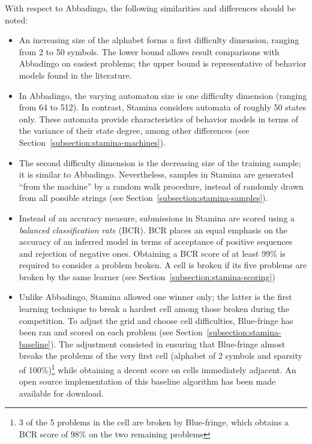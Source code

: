 With respect to Abbadingo, the following similarities and differences should be noted:

\begin{itemize}

\item An increasing size of the alphabet forms a first difficulty dimension, ranging from 2 to 50 symbols. The lower bound allows result comparisons with Abbadingo on easiest problems; the upper bound is representative of behavior models found in the literature.

\item In Abbadingo, the varying automaton size is one difficulty dimension (ranging from 64 to 512). In contrast, Stamina considers automata of roughly 50 states only. These automata provide characteristics of behavior models in terms of the variance of their state degree, among other differences (see Section~\ref{subsection:stamina-machines}).

\item The second difficulty dimension is the decreasing size of the training sample; it is similar to Abbadingo. Nevertheless, samples in Stamina are generated ``from the machine'' by a random walk procedure, instead of randomly drawn from all possible strings (see Section~\ref{subsection:stamina-samples}).

\item Instead of an accuracy measure, submissions in Stamina are scored using a \emph{balanced classification rate} (BCR). BCR places an equal emphasis on the accuracy of an inferred model in terms of acceptance of positive sequences and rejection of negative ones. Obtaining a BCR score of at least 99\% is required to consider a problem broken. A cell is broken if its five problems are broken by the same learner (see Section~\ref{subsection:stamina-scoring})

\item Unlike Abbadingo, Stamina allowed one winner only; the latter is the first learning technique to break a hardest cell among those broken during the competition. To adjust the grid and choose cell difficulties, Blue-fringe has been ran and scored on each problem (see Section~\ref{subsection:stamina-baseline}). The adjustment consisted in ensuring that Blue-fringe almost breaks the problems of the very first cell (alphabet of 2 symbols and sparsity of 100\%)\footnote{3 of the 5 problems in the cell are broken by Blue-fringe, which obtains a BCR score of 98\% on the two remaining problems} while obtaining a decent score on cells immediately adjacent. An open source implementation of this baseline algorithm has been made available for download.

\end{itemize}

